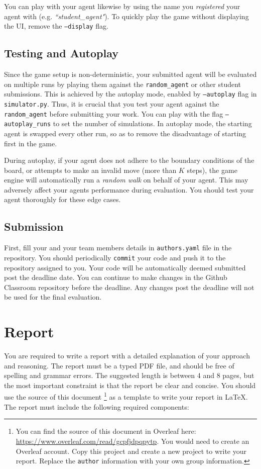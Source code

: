 \documentclass[twoside,11pt]{article}
\begin{document}
You can play with your agent likewise by using the name you \textit{registered} your agent with (e.g. \textit{``student\_agent"}). To quickly play the game without displaying the UI, remove the \texttt{--display} flag.

\subsection{Testing and Autoplay}

Since the game setup is non-deterministic, your submitted agent will be evaluated on multiple runs by playing them against the \texttt{random\_agent} or other student submissions. This is achieved by the autoplay mode, enabled by \texttt{--autoplay} flag in \texttt{simulator.py}. Thus, it is crucial that you test your agent against the \texttt{random\_agent} before submitting your work. You can play with the flag \texttt{--autoplay\_runs} to set the number of simulations. In autoplay mode, the starting agent is swapped every other run, so as to remove the disadvantage of starting first in the game.

During autoplay, if your agent does not adhere to the boundary conditions of the board, or attempts to make an invalid move (more than $K$ steps), the game engine will automatically run a \textit{random walk} on behalf of your agent. This may adversely affect your agents performance during evaluation. You should test your agent thoroughly for these edge cases.

\subsection{Submission}

First, fill your and your team members details in \texttt{authors.yaml} file in the repository.
You should periodically \texttt{commit} your code and push it to the repository assigned to you.
Your code will be automatically deemed submitted post the deadline date. You can continue to make changes in the Github Classroom repository before the deadline. Any changes post the deadline will not be used for the final evaluation.

\section{Report}

You are required to write a report with a detailed explanation of your approach and reasoning. The report must be a typed PDF file, and should be free of spelling and grammar errors. The suggested length is between 4 and 8 pages, but the most important constraint is that the report be clear and concise. You should use the source of this document \footnote{You can find the source of this document in Overleaf here: \href{https://www.overleaf.com/read/gcpfjdpqpytp}{https://www.overleaf.com/read/gcpfjdpqpytp}. You would need to create an Overleaf account. Copy this project and create a new project to write your report. Replace the \texttt{author} information with your own group information.} as a template to write your report in \LaTeX.  The report must include the following required components:
\end{document}
